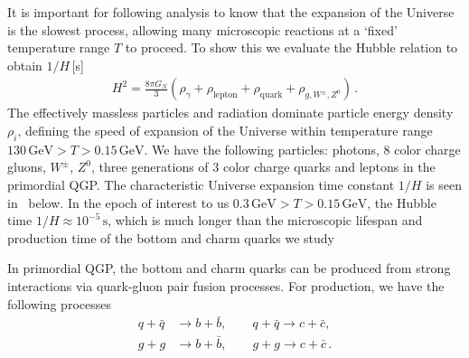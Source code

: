 It is important for following analysis to know that the expansion of the Universe is the slowest process, allowing many microscopic reactions at a `fixed' temperature range $T$ to proceed. To show this we evaluate the Hubble relation to obtain $1/H$\,[s]
\begin{align}
H^2=\frac{8\pi G_N}{3}\left(\rho_\gamma+\rho_{\mathrm{lepton}}+\rho_{\mathrm{quark}}+\rho_{g,{W^\pm},{Z^0}}\right)
\,.
\end{align}
The effectively massless particles and radiation dominate particle energy density $\rho_i$, defining the speed of expansion of the Universe within temperature range $130\, \mathrm{GeV}>T>0.15\,\mathrm{GeV}$. We have the following particles: photons, $8$ color charge gluons, $W^\pm$, $Z^0$, three generations of $3$ color charge quarks and leptons in the primordial QGP. The characteristic Universe expansion time constant $1/H$ is seen in~ below. In the epoch of interest to us $0.3\,\mathrm{GeV}>T>0.15\,\mathrm{GeV}$, the Hubble time $1/H\approx10^{-5}\,\mathrm{s}$, which is much longer than the microscopic lifespan and production time of the bottom and charm quarks we study 

In primordial QGP, the bottom and charm quarks can be produced from strong interactions via quark-gluon pair fusion processes. For production, we have the following processes
\begin{align}
 q+\bar{q}&\longrightarrow b+\bar b,\qquad q+\bar{q}\longrightarrow c+\bar c,\\
 g+g&\longrightarrow b+\bar b,\qquad g+g\longrightarrow c+\bar c\,.
\end{align}

